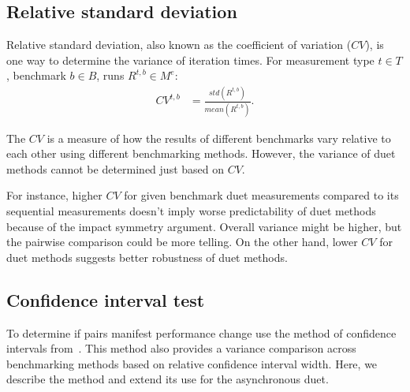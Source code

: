 \subsection{Relative standard deviation}
\label{sec:cv}

Relative standard deviation, also known as the coefficient of variation ($CV$), is one way to determine the variance of iteration times.
For measurement type $t \in T$, benchmark $b \in B$, runs $R^{t, b} \in M^e$:
\begin{align*}
CV^{t, b} &= \frac{std(R^{t, b})}{mean(R^{t, b})}.
\end{align*}

The $CV$ is a measure of how the results of different benchmarks vary relative to each other using different benchmarking methods.
However, the variance of duet methods cannot be determined just based on $CV$.

For instance, higher $CV$ for given benchmark duet measurements compared to its sequential measurements doesn't imply worse predictability of duet methods because of the impact symmetry argument.
Overall variance might be higher, but the pairwise comparison could be more telling.
On the other hand, lower $CV$ for duet methods suggests better robustness of duet methods.

\subsection{Confidence interval test}
\label{sec:ci_test}

To determine if pairs manifest performance change use the method of confidence intervals from~\citet{bulej2020duet}.
This method also provides a variance comparison across benchmarking methods based on relative confidence interval width.
Here, we describe the method and extend its use for the asynchronous duet.

